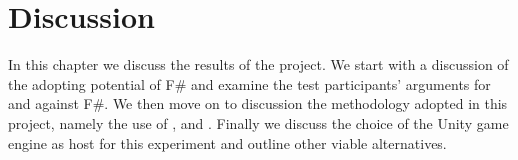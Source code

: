 \chapter{Discussion}
In this chapter we discuss the results of the project. We start with a discussion of the adopting potential of F\# and examine the test participants' arguments for and against F\#. We then move on to discussion the methodology adopted in this project, namely the use of \champagne, \attention and \cognitive. Finally we discuss the choice of the Unity game engine as host for this experiment and outline other viable alternatives. 



